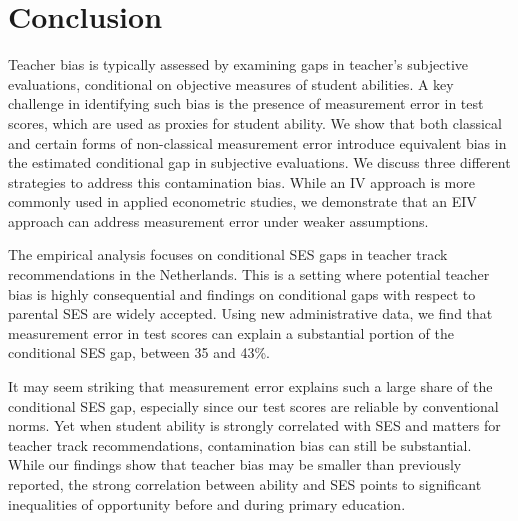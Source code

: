 \section{Conclusion}\label{sec:Conclusion}

Teacher bias is typically assessed by examining  gaps in teacher's subjective evaluations, conditional on objective measures of student abilities. A key challenge in identifying such bias is the presence of measurement error in test scores, which are used as proxies for student ability. We show that both classical and certain forms of non-classical measurement error introduce equivalent bias in the estimated conditional gap in subjective evaluations. We discuss three different strategies to address this contamination bias. While an IV approach is more commonly used in applied econometric studies, we demonstrate that an EIV approach can address measurement error under weaker assumptions.

The empirical analysis focuses on conditional SES gaps in teacher track recommendations in the Netherlands. This is a setting where potential teacher bias is highly consequential and findings on conditional gaps with respect to parental SES are widely accepted. Using new administrative data, we find that measurement error in test scores can explain a substantial portion of the conditional SES gap, between 35 and 43\%.

It may seem striking that measurement error explains such a large share of the conditional SES gap, especially since our test scores are reliable by conventional norms. Yet when student ability is strongly correlated with SES and matters for teacher track recommendations, contamination bias can still be substantial. While our findings show that teacher bias may be smaller than previously reported, the strong correlation between ability and SES points to significant inequalities of opportunity before and during primary education.